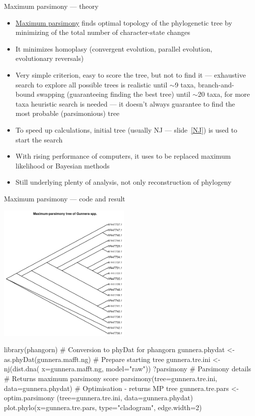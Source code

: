 \documentclass[compress, xelatex, 11pt, xcolor=svgnames, aspectratio=169,
	hyperref={
		bookmarks=true,
		unicode=true,
		colorlinks=true,
		pdftitle={Molecular data in R},
		plainpages=false,
		pdfauthor={Vojtech Zeisek},
		pdfsubject={Course about phylogeny and evolution in R},
		pdfcreator={XeLaTeX},
		pdfkeywords={R, evolution, phylogeny, molecular data},
		linkcolor=Crimson, %
		anchorcolor=Magenta, %
		citecolor=Magenta, %
		filecolor=Magenta, %
		menucolor=Magenta, %
		urlcolor=DodgerBlue, %
		},
	url={hyphens, lowtilde} %
	]{beamer}
\begin{document}
\begin{frame}{Maximum parsimony --- theory}
	\label{MP}
	\begin{itemize}
		\item \href{https://en.wikipedia.org/wiki/Maximum_parsimony_(phylogenetics)}{Maximum parsimony} finds optimal topology of the phylogenetic tree by minimizing of the total number of character-state changes
		\item It minimizes homoplasy (convergent evolution, parallel evolution, evolutionary reversals)
		\item Very simple criterion, easy to score the tree, but not to find it --- exhaustive search to explore all possible trees is realistic until $\sim$9 taxa, branch-and-bound swapping (guaranteeing finding the best tree) until $\sim$20 taxa, for more taxa heuristic search is needed --- it doesn't always guarantee to find the most probable (parsimonious) tree
		\item To speed up calculations, initial tree (usually NJ --- slide~\ref{NJ}) is used to start the search
		\item With rising performance of computers, it uses to be replaced maximum likelihood or Bayesian methods
		\item Still underlying plenty of analysis, not only reconstruction of phylogeny
	\end{itemize}
\end{frame}

\begin{frame}[fragile]{Maximum parsimony --- code and result}
	\begin{multicols}{2}
		\begin{center}
			\includegraphics[height=6.75cm]{parsimony.png}
		\end{center}
		\begin{spluscode}
    library(phangorn)
    # Conversion to phyDat for phangorn
    gunnera.phydat <-
      as.phyDat(gunnera.mafft.ng)
    # Prepare starting tree
    gunnera.tre.ini <- nj(dist.dna(
      x=gunnera.mafft.ng, model="raw"))
    ?parsimony # Parsimony details
    # Returns maximum parsimony score
    parsimony(tree=gunnera.tre.ini,
      data=gunnera.phydat)
    # Optimisation - returns MP tree
    gunnera.tre.pars <- optim.parsimony
      (tree=gunnera.tre.ini,
      data=gunnera.phydat)
    plot.phylo(x=gunnera.tre.pars,
      type="cladogram", edge.width=2)
		\end{spluscode}
	\end{multicols}
\end{frame}
\end{document}
